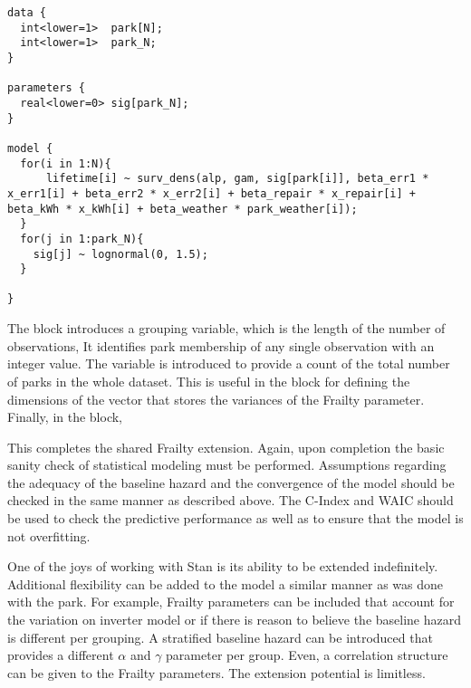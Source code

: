 \begin{lstlisting}
data {
  int<lower=1>  park[N];
  int<lower=1>  park_N;
}

parameters {
  real<lower=0> sig[park_N];
}

model {
  for(i in 1:N){
      lifetime[i] ~ surv_dens(alp, gam, sig[park[i]], beta_err1 * x_err1[i] + beta_err2 * x_err2[i] + beta_repair * x_repair[i] + beta_kWh * x_kWh[i] + beta_weather * park_weather[i]);
  }
  for(j in 1:park_N){
    sig[j] ~ lognormal(0, 1.5);
  }

}
\end{lstlisting}


The  block introduces a grouping variable,  which is the length of the number of observations,  It identifies  park membership of any single observation with an integer value. The  variable is introduced to provide a count of the total number of parks in the whole dataset. This is useful in the  block for defining the dimensions of the  vector that stores the variances of the Frailty parameter. Finally, in the  block, 

This completes the shared Frailty extension. Again, upon completion the basic sanity check of statistical modeling must be performed. Assumptions regarding the adequacy of the baseline hazard and the convergence of the model should be checked in the same manner as described above. The C-Index and WAIC should be used to check the predictive performance as well as to ensure that the model is not overfitting. 

One of the joys of working with Stan is its ability to be extended indefinitely. Additional flexibility can be added to the model a similar manner as was done with the park. For example, Frailty parameters can be included that account for the variation on inverter model or if there is reason to believe the baseline hazard is different per grouping. A stratified baseline hazard can be introduced that provides a different $\alpha$ and $\gamma$ parameter per group. Even, a correlation structure can be given to the Frailty parameters. The extension potential is limitless. 












